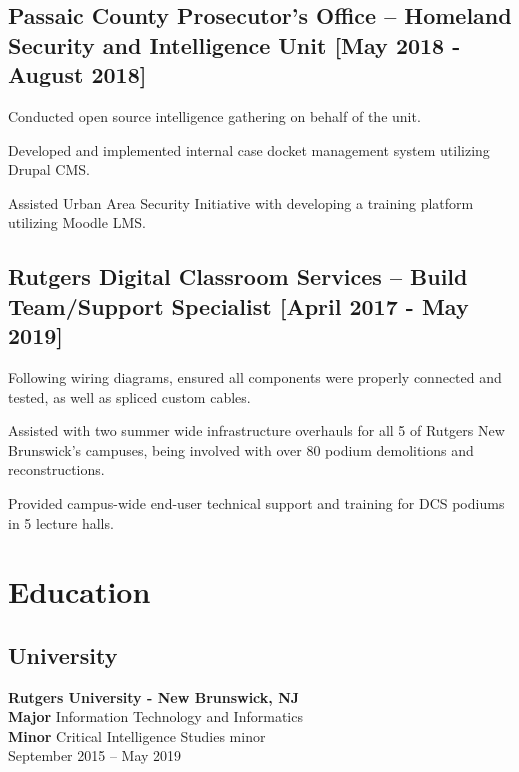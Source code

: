 \documentclass{article}
\begin{document}
\begin{samepage}
		\subsection{Passaic County Prosecutor's Office -- Homeland Security and Intelligence Unit [May 2018 - August 2018]}
		\begin{compactitem}
			\item Conducted open source intelligence gathering on behalf of the unit.
			\item Developed and implemented internal case docket management system utilizing Drupal CMS.
			\item Assisted Urban Area Security Initiative with developing a training platform utilizing Moodle LMS.
		\end{compactitem}
		\subsection{Rutgers Digital Classroom Services -- Build Team/Support Specialist [April 2017 - May 2019]}
		\begin{compactitem}
			\item Following wiring diagrams, ensured all components were properly connected and tested, as well as spliced custom cables.
			\item Assisted with two summer wide infrastructure overhauls for all 5 of Rutgers New Brunswick's campuses, being involved with over 80 podium demolitions and reconstructions.
			\item Provided campus-wide end-user technical support and training for DCS podiums in 5 lecture halls.
		\end{compactitem}
		
		\section{Education}
		\noindent%
		\begin{minipage}[t]{.55\textwidth}
			\subsection*{University}
			\textbf{Rutgers University - New Brunswick, NJ} \\
			\textbf{Major} Information Technology and Informatics \\
			\textbf{Minor} Critical Intelligence Studies minor \\
			September 2015 -- May 2019
		\end{minipage}%
		\hfill
		\begin{minipage}[t]{.35\textwidth}

\end{minipage}
\end{samepage}
\end{document}
